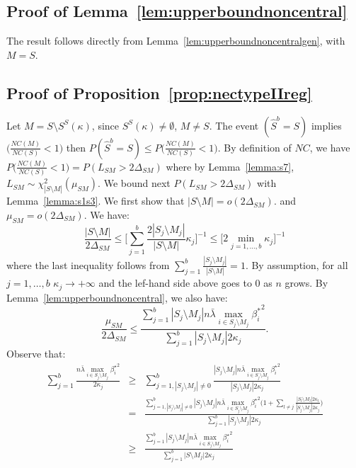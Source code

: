 \documentclass[aos]{imsart}
\theoremstyle{plain}
\begin{document}
\subsection{Proof of Lemma~\ref{lem:upperboundnoncentral}}
The result follows directly from Lemma~\ref{lem:upperboundnoncentralgen}, with $M=S$.

\subsection{Proof of Proposition~\ref{prop:nectypeIIreg}}

Let $M=S\setminus S^{S}(\kappa)$, since $S^{S}(\kappa)\neq \emptyset$, $M\neq S$. The event $(\hat{S}^b=S)$ implies $\big(\frac{NC(M)}{NC(S)}<1\big)$ then $P(\hat{S}^b=S)\leq P\big(\frac{NC(M)}{NC(S)}<1\big)$. By definition of $NC$, we have
$P\big(\frac{NC(M)}{NC(S)}<1\big) = P(L_{SM}> 2\Delta_{SM})$ where by Lemma~\ref{lemma:s7},  $L_{SM}\sim \chi_{|S\setminus M|}^2(\mu_{SM})$. We  bound next $P(L_{SM}> 2\Delta_{SM})$ with Lemma~\ref{lemma:s1s3}. We first show that $|S\setminus M|=o(2\Delta_{SM})$. and $\mu_{SM}=o(2\Delta_{SM})$. We have:
$$\frac{|S\setminus M|}{2\Delta_{SM}}\leq \bigg[\sum_{j=1}^b\frac{2|S_j \setminus M_j|}{|S\setminus M|}\kappa_j \bigg]^{-1} \leq \Big[ 2\min_{j=1,\ldots,b}\kappa_j \Big]^{-1} $$
where the last inequality follows from $\sum_{j=1}^b\frac{|S_j \setminus M_j|}{|S\setminus M|}=1$. By assumption, for all $j=1,\ldots,b$ $\kappa_j\to +\infty$ and the lef-hand side above goes to 0 as $n$ grows. By Lemma~\ref{lem:upperboundnoncentral}, we also have:
$$\frac{\mu_{SM}}{2\Delta_{SM}}\leq \frac{ \sum_{j=1}^b |S_j\setminus M_j|n\bar{\lambda}\max_{i\in S_j\setminus M_j}{\beta_i^*}^2}{\sum_{j=1}^b |S_j\setminus M_j|2 \kappa_j}.$$
Observe that:
\begin{eqnarray*}
    \sum_{j=1}^b\frac{n\bar{\lambda}\max_{i\in S_j\setminus M_j}{\beta_i^{\star}}^2}{2\kappa_j}
    &\geq &\sum_{j=1,|S_j\setminus M_j|\neq 0}^b\frac{|S_j\setminus M_j|n\bar{\lambda}\max_{i\in S_j\setminus M_j}{\beta_i^{\star}}^2}{|S_j\setminus M_j|2\kappa_j} \\
    &=& \frac{\sum_{j=1,|S_j\setminus M_j|\neq 0 }^b|S_j\setminus M_j|n\bar{\lambda}\max_{i\in S_j\setminus M_j}{\beta_i^{\star}}^2\Big(1+\sum_{l\neq j}\frac{|S_l\setminus M_l|2\kappa_l}{|S_j\setminus M_j|2\kappa_j}\Big)}{\sum_{j=1}^b|S_j\setminus M_j|2\kappa_j} \\
    &\geq & \frac{\sum_{j=1}^b|S_j\setminus M_j|n\bar{\lambda}\max_{i\in S_j\setminus M_j}{\beta_i^{\star}}^2}{\sum_{j=1}^b \big|S\setminus M_j\big|2\kappa_j}
\end{eqnarray*}
\end{document}
